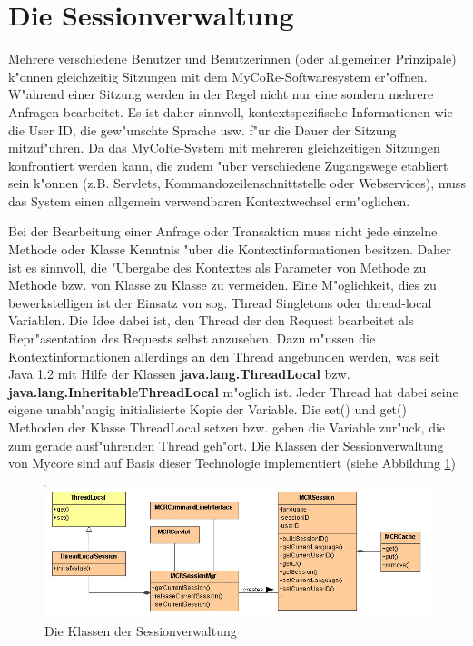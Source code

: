 \section{Die Sessionverwaltung}

Mehrere verschiedene Benutzer und Benutzerinnen (oder allgemeiner Prinzipale) 
k"onnen gleichzeitig Sitzungen mit dem MyCoRe-Softwaresystem er"offnen. 
W"ahrend einer Sitzung werden in der Regel nicht nur eine sondern mehrere Anfragen bearbeitet. 
Es ist daher sinnvoll, kon\-text\-spe\-zi\-fi\-sche Informationen wie die User ID, die 
gew"unschte Sprache usw. f"ur die Dauer der Sitzung mitzuf"uhren.
Da das MyCoRe-System mit mehreren gleichzeitigen Sitzungen konfrontiert
werden kann, die zudem "uber verschiedene Zugangswege etabliert sein k"onnen
(z.B. Servlets, Kommandozeilenschnittstelle oder Webservices), muss das System
einen allgemein verwendbaren Kontextwechsel erm"oglichen. 

Bei der Bearbeitung einer Anfrage oder Transaktion muss nicht jede einzelne
Methode oder Klasse Kenntnis "uber die Kontextinformationen besitzen.
Daher ist es sinnvoll, die "Ubergabe des Kontextes als Parameter von Methode
zu Methode bzw. von Klasse zu Klasse zu vermeiden.
Eine M"oglichkeit, dies zu bewerkstelligen ist der Einsatz von sog. Thread Singletons oder
thread-local Variablen.
Die Idee dabei ist, den Thread der den Request bearbeitet als Repr"asentation
des Requests selbst anzusehen.
Dazu m"ussen die Kontextinformationen allerdings an den Thread angebunden werden, was
seit Java 1.2 mit Hilfe der Klassen {\bf java.lang.ThreadLocal} bzw. 
{\bf java.lang.InheritableThreadLocal} m"oglich ist.
Jeder Thread hat dabei seine eigene unabh"angig initialisierte Kopie der Variable.
Die set() und get() Methoden der Klasse ThreadLocal setzen bzw. geben die Variable
zur"uck, die zum gerade ausf"uhrenden Thread geh"ort.
Die Klassen der Sessionverwaltung von Mycore sind auf Basis dieser Technologie
implementiert (siehe Abbildung {\ref{fig:Sessionklassen}})

\begin{figure}[h]
  \begin{center}
    \includegraphics[scale=0.55]{ProgGuide_2Session_classes.jpg}
    \caption{Die Klassen der Sessionverwaltung}
    \label{fig:Sessionklassen}
  \end{center}
\end{figure} 

